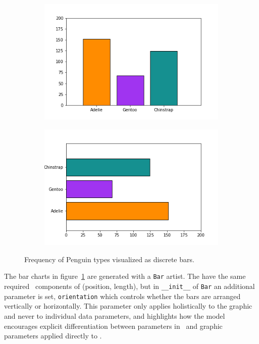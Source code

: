 \documentclass[../main.tex]{subfiles}
\begin{document}
 
\begin{figure}[H]
    \begin{subfigure}{0.5\textwidth}
        \includegraphics[width=\textwidth]{figures/code/bar_v.png}
    \end{subfigure}
    \begin{subfigure}{0.5\textwidth}
        \includegraphics[width=\textwidth]{figures/code/bar_h.png}
    \end{subfigure}
    \caption{Frequency of Penguin types visualized as discrete bars. }
    \label{fig:code_bar_simple}
\end{figure}
The bar charts in figure~\ref{fig:code_bar_simple} are generated with a \texttt{Bar} artist. The have the same required \vfiber\ components of (position, length), but in \texttt{__init__} of \texttt{Bar} an additional parameter is set, \texttt{orientation} which controls whether the bars are arranged vertically or horizontally. This parameter only applies holistically to the graphic and never to individual data parameters, and highlights how the model encourages explicit differentiation between parameters in \vtotal\ and graphic parameters applied directly to \vmarkd. 
\end{document}
